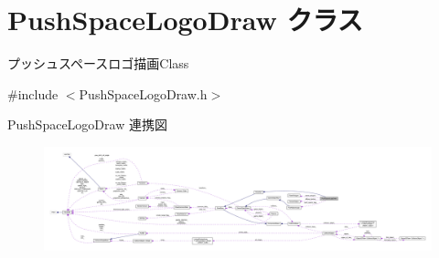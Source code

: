 \hypertarget{class_push_space_logo_draw}{}\section{Push\+Space\+Logo\+Draw クラス}
\label{class_push_space_logo_draw}


プッシュスペースロゴ描画\+Class  




{\ttfamily \#include $<$Push\+Space\+Logo\+Draw.\+h$>$}



Push\+Space\+Logo\+Draw 連携図\nopagebreak
\begin{figure}[H]
\begin{center}
\leavevmode
\includegraphics[width=350pt]{class_push_space_logo_draw__coll__graph}
\end{center}
\end{figure}

